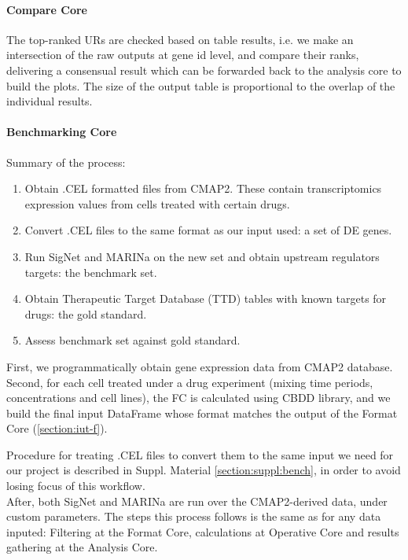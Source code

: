 \paragraph{Compare Core}
The top-ranked URs are checked based on table results, i.e. we make an intersection of the raw outputs at gene id level, and compare their ranks, delivering a consensual result which can be forwarded back to the analysis core to build the plots.
The size of the output table is proportional to the overlap of the individual results.

\paragraph{Benchmarking Core}
Summary of the process:
\begin{enumerate}
    \item Obtain .CEL formatted files from CMAP2. These contain transcriptomics expression values from cells treated with certain drugs.
    \item Convert .CEL files to the same format as our input used: a set of DE genes.
    \item Run SigNet and MARINa on the new set and obtain upstream regulators targets: the benchmark set.
    \item Obtain Therapeutic Target Database (TTD) tables with known targets for drugs: the gold standard.
    \item Assess benchmark set against gold standard.
\end{enumerate}

First, we programmatically obtain gene expression data from CMAP2 database. Second, for each cell treated under a drug experiment (mixing time periods, concentrations and cell lines), the FC is calculated using CBDD library, and we build the final input DataFrame whose format matches the output of the Format Core (\ref{section:iut-f}).

Procedure for treating .CEL files to convert them to the same input we need for our project is described in Suppl. Material \ref{section:suppl:bench}, in order to avoid losing focus of this workflow.
\\

After, both SigNet and MARINa are run over the CMAP2-derived data, under custom parameters. The steps this process follows is the same as for any data inputed:
Filtering at the Format Core, calculations at Operative Core and results gathering at the Analysis Core.
\\

